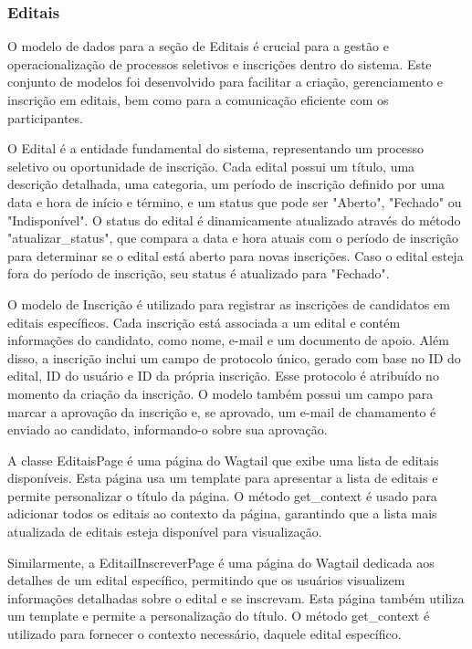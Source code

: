 \subsubsection{Editais}

O modelo de dados para a seção de Editais é crucial para a gestão e operacionalização de processos seletivos e inscrições dentro do sistema. Este conjunto de modelos foi desenvolvido para facilitar a criação, gerenciamento e inscrição em editais, bem como para a comunicação eficiente com os participantes.

O Edital é a entidade fundamental do sistema, representando um processo seletivo ou oportunidade de inscrição. Cada edital possui um título, uma descrição detalhada, uma categoria, um período de inscrição definido por uma data e hora de início e término, e um status que pode ser "Aberto", "Fechado" ou "Indisponível". O status do edital é dinamicamente atualizado através do método "atualizar\_status", que compara a data e hora atuais com o período de inscrição para determinar se o edital está aberto para novas inscrições. Caso o edital esteja fora do período de inscrição, seu status é atualizado para "Fechado".

O modelo de Inscrição é utilizado para registrar as inscrições de candidatos em editais específicos. Cada inscrição está associada a um edital e contém informações do candidato, como nome, e-mail e um documento de apoio. Além disso, a inscrição inclui um campo de protocolo único, gerado com base no ID do edital, ID do usuário e ID da própria inscrição. Esse protocolo é atribuído no momento da criação da inscrição. O modelo também possui um campo para marcar a aprovação da inscrição e, se aprovado, um e-mail de chamamento é enviado ao candidato, informando-o sobre sua aprovação.

A classe EditaisPage é uma página do Wagtail que exibe uma lista de editais disponíveis. Esta página usa um template para apresentar a lista de editais e permite personalizar o título da página. O método get\_context é usado para adicionar todos os editais ao contexto da página, garantindo que a lista mais atualizada de editais esteja disponível para visualização.

Similarmente, a EditailInscreverPage é uma página do Wagtail dedicada aos detalhes de um edital específico, permitindo que os usuários visualizem informações detalhadas sobre o edital e se inscrevam. Esta página também utiliza um template e permite a personalização do título. O método get\_context é utilizado para fornecer o contexto necessário, daquele edital específico.

